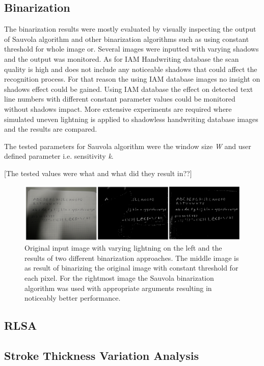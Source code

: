 \documentclass{article}
\begin{document}
  \subsection{Binarization}
    The binarization results were mostly evaluated by visually inspecting the output of Sauvola algorithm and other binarization algorithms such as using constant threshold for whole image or. Several images were inputted with varying shadows and the output was monitored. As for IAM Handwriting database the scan quality is high and does not include any noticeable shadows that could affect the recognition process. For that reason the using IAM database images no insight on shadows effect could be gained. Using IAM database the effect on detected text line numbers with different constant parameter values could be monitored without shadows impact. More extensive experiments are required where simulated uneven lightning is applied to shadowless handwriting database images and the results are compared.

     The tested parameters for Sauvola algorithm were the window size \textit{W} and user defined parameter i.e. sensitivity \textit{k}.

     {\color{red}[The tested values were what and what did they result in??]}

    \begin{figure}
      \centering
      \includegraphics[natwidth=2140,natheight=546,scale=0.24]{binarization.png}
      \caption{Original input image with varying lightning on the left and the results of two different binarization approaches. The middle image is as result of binarizing the original image with constant threshold for each pixel. For the rightmost image the Sauvola binarization algorithm was used with appropriate arguments resulting in noticeably better performance. \label{fig:binarization}}
    \end{figure}

    \subsection{RLSA}

    \subsection{Stroke Thickness Variation Analysis}
\end{document}
